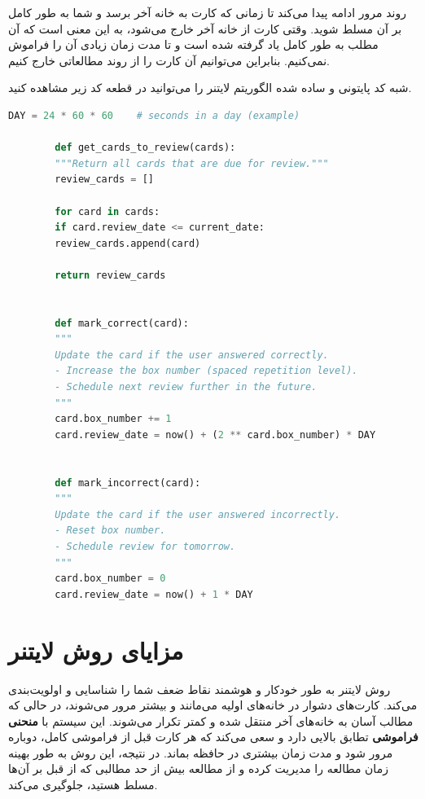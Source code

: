\documentclass[12pt]{report}
\begin{document}
روند مرور ادامه پیدا می‌کند تا زمانی که کارت به خانه آخر برسد و شما به طور کامل بر آن مسلط شوید. وقتی کارت از خانه آخر خارج می‌شود، به این معنی است که آن مطلب به طور کامل یاد گرفته شده است و تا مدت زمان زیادی آن را فراموش نمی‌کنیم. بنابراین می‌توانیم آن کارت را از روند مطالعاتی خارج کنیم.

شبه کد پایتونی و ساده شده الگوریتم لایتنر را می‌توانید در قطعه کد زیر مشاهده کنید.

\begin{latin}
    
    \begin{lstlisting}[language=Python]
        DAY = 24 * 60 * 60    # seconds in a day (example)
        
        def get_cards_to_review(cards):
        """Return all cards that are due for review."""
        review_cards = []
        
        for card in cards:
        if card.review_date <= current_date:
        review_cards.append(card)
        
        return review_cards
        
        
        def mark_correct(card):
        """
        Update the card if the user answered correctly.
        - Increase the box number (spaced repetition level).
        - Schedule next review further in the future.
        """
        card.box_number += 1
        card.review_date = now() + (2 ** card.box_number) * DAY
        
        
        def mark_incorrect(card):
        """
        Update the card if the user answered incorrectly.
        - Reset box number.
        - Schedule review for tomorrow.
        """
        card.box_number = 0
        card.review_date = now() + 1 * DAY
    \end{lstlisting}
\end{latin}

\section{مزایای روش لایتنر}
روش لایتنر به طور خودکار و هوشمند نقاط ضعف شما را شناسایی و اولویت‌بندی می‌کند. کارت‌های دشوار در خانه‌های اولیه می‌مانند و بیشتر مرور می‌شوند، در حالی که مطالب آسان به خانه‌های آخر منتقل شده و کمتر تکرار می‌شوند. این سیستم با \textbf{منحنی فراموشی} تطابق بالایی دارد و سعی می‌کند که هر کارت قبل از فراموشی کامل، دوباره مرور شود و مدت زمان بیشتری در حافظه بماند.
در نتیجه، این روش به طور بهینه زمان مطالعه را مدیریت کرده و از مطالعه بیش از حد مطالبی که از قبل بر آن‌ها مسلط هستید، جلوگیری می‌کند.
\end{document}

